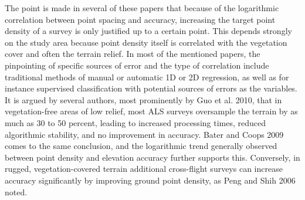 The point is made in several of these papers that because of the logarithmic correlation between point spacing and accuracy, increasing the target point density of a survey is only justified up to a certain point. This depends strongly on the study area because point density itself is correlated with the vegetation cover and often the terrain relief. In most of the mentioned papers, the pinpointing of specific sources of error and the type of correlation include traditional methods of manual or automatic 1D or 2D regression, as well as for instance supervised classification with potential sources of errors as the variables. It is argued by several authors, most prominently by Guo et al. 2010, that in vegetation-free areas of low relief, most ALS surveys oversample the terrain by as much as 30 to 50 percent, leading to increased processing times, reduced algorithmic stability, and no improvement in accuracy. Bater and Coops 2009 comes to the same conclusion, and the logarithmic trend generally observed between point density and elevation accuracy further supports this. Conversely, in rugged, vegetation-covered terrain additional cross-flight surveys can increase accuracy significantly by improving ground point density, as Peng and Shih 2006 noted.

